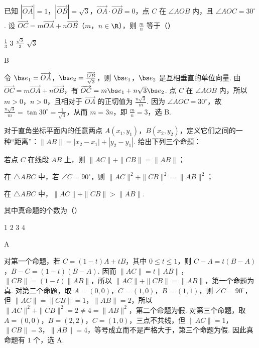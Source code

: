 \begin{problem}
已知 \(\left|\overrightarrow{OA}\right|=1\)，\(\left|\overrightarrow{OB}\right|=\sqrt{3}\)，\(\overrightarrow{OA}\cdot\overrightarrow{OB}=0\)，点 \(C\) 在 \( \angle AOB \) 内，且 \( \angle AOC=30^{\circ}\). 设 \( \overrightarrow{OC}=m\overrightarrow{OA}+n\overrightarrow{OB} \)（\(m\)，\(n\in\R\)），则 \( \frac{m}{n} \) 等于（\quad）

\choices
    {\( \frac{1}{3} \)}
    {3}
    {\( \frac{\sqrt{3}}{3} \)}
    {\(\sqrt{3}\)}
\end{problem}

\begin{answer}
B
\end{answer}

\begin{solution}
令 \(\bs e_1=\overrightarrow{OA}\)，\(\bs e_2=\frac{\overrightarrow{OB}}{\sqrt{3}}\)，则 \(\bs e_1\)，\(\bs e_2\) 是互相垂直的单位向量. 由 \(\overrightarrow{OC}=m\overrightarrow{OA}+n\overrightarrow{OB}\)，有 \(\overrightarrow{OC}=m\bs e_1+n\sqrt{3}\bs e_2\). 点 \(C\) 在 \(\angle AOB\) 内，所以 \(m>0\)，\(n>0\)，且相对于 \(\overrightarrow{OA}\) 的正切值为 \(\frac{n\sqrt{3}}{m}\). 因为 \(\angle AOC=30^\circ\)，故 \(\frac{n\sqrt{3}}{m}=\tan30^\circ=\frac{1}{\sqrt{3}}\)，从而 \(m=3n\)，即 \(\frac{m}{n}=3\)，选 B.
\end{solution}

\begin{problem}
对于直角坐标平面内的任意两点 \(A(x_{1}, y_{1})\)，\(B(x_{2}, y_{2})\)，定义它们之间的一种“距离”：\(\|AB\| = |x_{2} - x_{1}| + |y_{2} - y_{1}|\). 给出下列三个命题：

\begin{circlelist}
\item 若点 \(C\) 在线段 \(AB\) 上，则 \( \|AC\| + \|CB\| = \|AB\| \)；
\item 在 \(\triangle ABC\) 中，若 \(\angle C = 90^{\circ}\)，则 \(\|AC\|^{2} + \|CB\|^{2} = \|AB\|^{2}\)；
\item 在 \(\triangle ABC\) 中，\(\|AC\| + \|CB\| > \|AB\|\).
\end{circlelist}

其中真命题的个数为（\quad）

\choices
    {1}
    {2}
    {3}
    {4}
\end{problem}

\begin{answer}
A
\end{answer}

\begin{solution}
对第一个命题，若 \(C=(1-t)A+tB\)，其中 \(0\leq t\leq1\)，则 \(C-A=t(B-A)\)，\(B-C=(1-t)(B-A)\). 因而 \(\|AC\|=t\|AB\|\)，\(\|CB\|=(1-t)\|AB\|\)，所以 \(\|AC\|+\|CB\|=\|AB\|\)，第一个命题为真. 对第二个命题，取 \(A=(0,0)\)，\(C=(1,0)\)，\(B=(1,1)\)，则 \(\angle C=90^\circ\)，但 \(\|AC\|=\|CB\|=1\)，\(\|AB\|=2\)，所以 \(\|AC\|^2+\|CB\|^2=2\ne4=\|AB\|^2\)，第二个命题为假. 对第三个命题，取 \(A=(0,0)\)，\(B=(2,2)\)，\(C=(1,0)\)，三点不共线，但 \(\|AC\|=1\)，\(\|CB\|=3\)，\(\|AB\|=4\)，等号成立而不是严格大于，第三个命题为假. 因此真命题有 \(1\) 个，选 A.
\end{solution}

